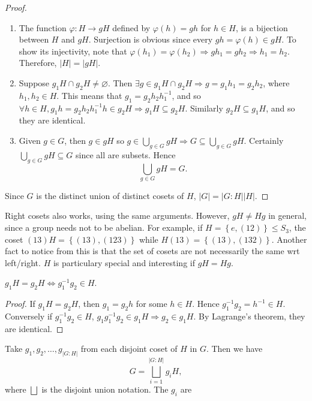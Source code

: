 \documentclass[a4paper]{article}
\begin{document}
\begin{proof}
  \begin{enumerate}
    \item The function $ \varphi:H\to gH $ defined by $ \varphi(h)=gh
      $ for $h\in H$, is a bijection between $H$ and $gH$. Surjection
      is obvious since every $ gh=\varphi(h)\in gH $. To show its
      injectivity, note that $\varphi(h_1)=\varphi(h_2)\Rightarrow
      gh_1=gh_2 \Rightarrow h_1=h_2 $. Therefore, $ |H|=|gH|$.
    \item Suppose $ g_1H\cap g_2H\neq \varnothing $. Then $ \exists
      g\in g_1H\cap g_2H \Rightarrow g=g_1h_1=g_2h_2 $, where
      $h_1,h_2\in H$. This means that $ g_1=g_2h_2h_1^{-1} $, and so
      $ \forall h\in H, g_1h=g_2h_2h_1^{-1}h\in g_2H \Rightarrow g_1H
      \subseteq g_2H $. Similarly $ g_2H \subseteq g_1H $, and so
      they are identical.
    \item Given $g\in G$, then $ g\in gH $ so $ g\in \bigcup_{g\in
      G}gH \Rightarrow G \subseteq \bigcup_{g\in G}gH $. Certainly $
      \bigcup_{g\in G}gH \subseteq G $ since all are subsets. Hence
      \[
        \bigcup_{g\in G}gH=G
      .\]
  \end{enumerate}
  Since $G$ is the distinct union of distinct cosets of $H$, $|G|=|G:H||H|$.
\end{proof}
\begin{remark}
  Right cosets also works, using the same arguments. However, $
  gH\neq Hg $ in general, since a group needs not to be abelian. For
  example, if $ H=\left\{ e,(12)\right\}\le S_3 $, the coset $
  (13)H=\left\{ (13),(123)\right\} $ while $ H(13)=\left\{
  (13),(132)\right\} $. Another fact to notice from this is that the
  set of cosets are not necessarily the same wrt left/right. $H$ is
  particulary special and interesting if $ gH=Hg $.
\end{remark}
\begin{proposition}\label{prop:3.4}
  $ g_1H=g_2H \Longleftrightarrow g_1^{-1}g_2\in H $.
\end{proposition}
\begin{proof}
  If $ g_1H=g_2H $, then $ g_1=g_2h $ for some $h\in H$. Hence $
  g_1^{-1}g_2=h^{-1}\in H $. Conversely if $ g_1^{-1}g_2\in H $, $
  g_1 g_1^{-1}g_2\in g_1H \Rightarrow g_2\in g_1H $. By Lagrange's
  theorem, they are identical.
\end{proof}
Take $ g_1,g_2,\dots,g_{|G:H|} $ from each disjoint coset of $H$ in
$G$. Then we have
\[
  G=\bigsqcup_{i=1}^{|G:H|}g_iH
,\]
where $ \bigsqcup  $ is the disjoint union notation. The $g_i$ are
\end{document}

